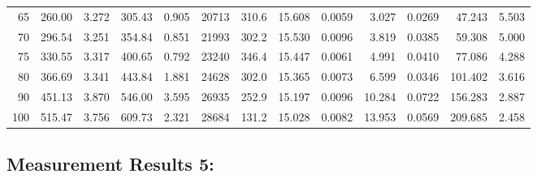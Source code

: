 \documentclass[10pt]{article}
\begin{document}
{\begin{tabular}{|r|rr|rr|rr|rr|rr|r|r|}
       65 &       260.00 &        3.272 &       305.43 &        0.905 &        20713 &        310.6 &       15.608 &       0.0059 &        3.027 &       0.0269 &       47.243 &        5.503 \\
       70 &       296.54 &        3.251 &       354.84 &        0.851 &        21993 &        302.2 &       15.530 &       0.0096 &        3.819 &       0.0385 &       59.308 &        5.000 \\
       75 &       330.55 &        3.317 &       400.65 &        0.792 &        23240 &        346.4 &       15.447 &       0.0061 &        4.991 &       0.0410 &       77.086 &        4.288 \\
       80 &       366.69 &        3.341 &       443.84 &        1.881 &        24628 &        302.0 &       15.365 &       0.0073 &        6.599 &       0.0346 &      101.402 &        3.616 \\
       90 &       451.13 &        3.870 &       546.00 &        3.595 &        26935 &        252.9 &       15.197 &       0.0096 &       10.284 &       0.0722 &      156.283 &        2.887 \\
      100 &       515.47 &        3.756 &       609.73 &        2.321 &        28684 &        131.2 &       15.028 &       0.0082 &       13.953 &       0.0569 &      209.685 &        2.458 \\
\hline
\end{tabular}
}



\subsection*{\large \bf Measurement Results 5:}
\end{document}

